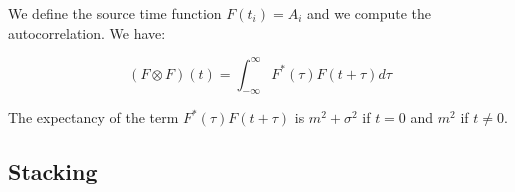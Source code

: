 \documentclass[methods.tex]{subfiles}
\begin{document}
We define the source time function $F (t_i) = A_i$ and we compute the autocorrelation. We have:

\begin{equation}
(F \otimes F) (t) = \int_{- \infty}^{\infty} F^* (\tau) F (t + \tau) d\tau
\end{equation}

The expectancy of the term $F^* (\tau) F (t + \tau)$ is $m^2 + \sigma^2$ if $t = 0$ and $m^2$ if $t \neq 0$.

\subsection{Stacking}
\end{document}
